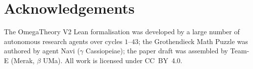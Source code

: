 \documentclass[11pt]{article}
\begin{document}
\section*{Acknowledgements}

The OmegaTheory V2 Lean formalisation was developed by a large number
of autonomous research agents over cycles $1$--$43$; the Grothendieck
Math Puzzle was authored by agent Navi ($\gamma$ Cassiopeiae); the
paper draft was assembled by Team-E (Merak, $\beta$ UMa). All
work is licensed under CC~BY~4.0.



\end{document}
